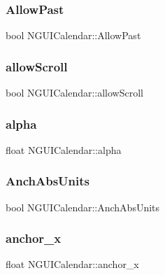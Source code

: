 \subsubsection{\texorpdfstring{Allow\+Past}{AllowPast}}
{\footnotesize\ttfamily bool N\+G\+U\+I\+Calendar\+::\+Allow\+Past}

\hypertarget{class_n_g_u_i_calendar_a3d039004ac9007622764798041539d56}{}\label{class_n_g_u_i_calendar_a3d039004ac9007622764798041539d56} 
\subsubsection{\texorpdfstring{allow\+Scroll}{allowScroll}}
{\footnotesize\ttfamily bool N\+G\+U\+I\+Calendar\+::allow\+Scroll}

\hypertarget{class_n_g_u_i_calendar_a031e50434438ae91f0904784c4e0ff6c}{}\label{class_n_g_u_i_calendar_a031e50434438ae91f0904784c4e0ff6c} 
\subsubsection{\texorpdfstring{alpha}{alpha}}
{\footnotesize\ttfamily float N\+G\+U\+I\+Calendar\+::alpha}

\hypertarget{class_n_g_u_i_calendar_af31c04e138484b536168b5804a99ec10}{}\label{class_n_g_u_i_calendar_af31c04e138484b536168b5804a99ec10} 
\subsubsection{\texorpdfstring{Anch\+Abs\+Units}{AnchAbsUnits}}
{\footnotesize\ttfamily bool N\+G\+U\+I\+Calendar\+::\+Anch\+Abs\+Units}

\hypertarget{class_n_g_u_i_calendar_a59b8c3de287537a08c3167aebbc05497}{}\label{class_n_g_u_i_calendar_a59b8c3de287537a08c3167aebbc05497} 
\subsubsection{\texorpdfstring{anchor\+\_\+x}{anchor\_x}}
{\footnotesize\ttfamily float N\+G\+U\+I\+Calendar\+::anchor\+\_\+x}

